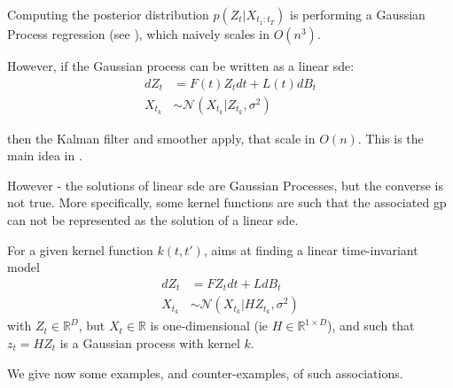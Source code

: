 Computing the posterior distribution $p(Z_t \vert X_{t_1:t_T})$ is performing a Gaussian Process 
regression (see \cite{rasmussen_gaussian_2008}), which naively scales in $O(n^{3})$.

However, if the Gaussian process can be written as a linear \gls{sde}:
\begin{align}
    \label{gpvae linear sde form}
    dZ_t &= F(t)Z_t dt + L(t)dB_t \\
    X_{t_k} &\sim \mathcal{N}(X_{t_k} \vert Z_{t_k}, \sigma^{2})
\end{align}

then the Kalman filter and smoother apply, that scale in $O(n)$. This is the main idea in \cite{zhu_markovian_2023}.

However - the solutions of linear \gls{sde} are Gaussian Processes, but the converse is not true. 
More specifically, some kernel functions are such that the associated \gls{gp} can not be represented as 
the solution of a linear \gls{sde}.

For a given kernel function $k(t,t')$, \cite{sarkka_applied_2019} aims at finding a linear time-invariant model
\begin{align}
    dZ_t &= F Z_t dt + L dB_t \\
    X_{t_k} &\sim \mathcal{N} (X_{t_k} \vert H Z_{t_k} , \sigma^{2})
\end{align}
with $Z_t \in  \mathbb{R}^{D}$, but $X_t \in \mathbb{R}$ is one-dimensional (ie $H \in \mathbb{R}^{1 \times D}$), 
and such that $z_t = H Z_t$ is a Gaussian process with kernel $k$.

We give now some examples, and counter-examples, of such associations.

